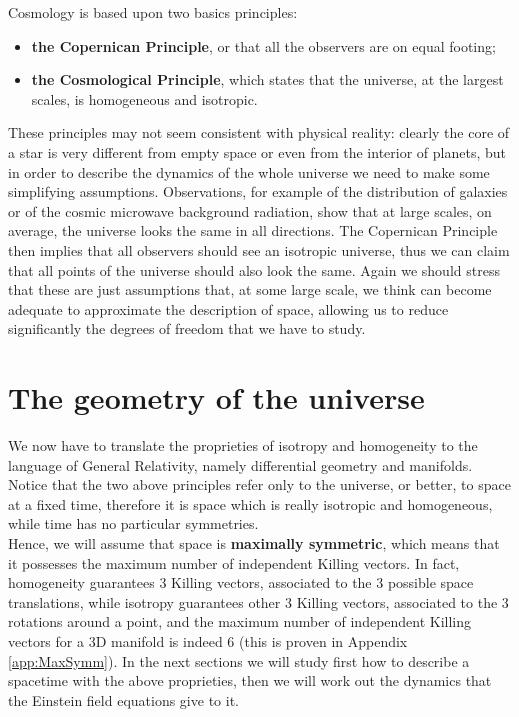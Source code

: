 Cosmology is based upon two basics principles:
\begin{itemize}
    \item \textbf{the Copernican Principle}, or that all the observers are on equal footing;
    \item \textbf{the Cosmological Principle}, which states that the universe, at the largest scales, is homogeneous and isotropic.
\end{itemize}
These principles may not seem consistent with physical reality: clearly the core of a star is very different from empty space or even from the interior of planets, but in order to describe the dynamics of the whole universe we need to make some simplifying assumptions. Observations, for example of the distribution of galaxies or of the cosmic microwave background radiation, show that at large scales, on average, the universe looks the same in all directions. The Copernican Principle then implies that all observers should see an isotropic universe, thus we can claim that all points of the universe should also look the same. Again we should stress that these are just assumptions that, at some large scale, we think can become adequate to approximate the description of space, allowing us to reduce significantly the degrees of freedom that we have to study.
\section{The geometry of the universe}
We now have to translate the proprieties of isotropy and homogeneity to the language of General Relativity, namely differential geometry and manifolds.\\ Notice that the two above principles refer only to the universe, or better, to space at a fixed time, therefore it is space which is really isotropic and homogeneous, while time has no particular symmetries.\\
Hence, we will assume that space is \textbf{maximally symmetric}, which means that it possesses the maximum number of independent Killing vectors. In fact, homogeneity guarantees 3 Killing vectors, associated to the 3 possible space translations, while isotropy guarantees other 3 Killing vectors, associated to the 3 rotations around a point, and the maximum number of independent Killing vectors for a 3D manifold is indeed 6 (this is proven in Appendix \ref{app:MaxSymm}).
In the next sections we will study first how to describe a spacetime with the above proprieties, then we will work out the dynamics that the Einstein field equations give to it.
